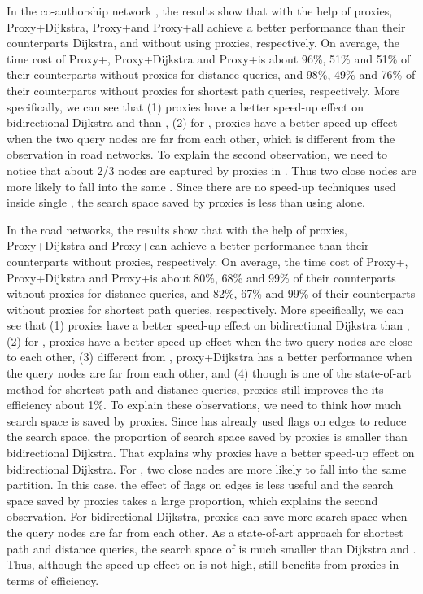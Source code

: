 In the co-authorship network \dblpone, the results show that with the help of proxies, Proxy+Dijkstra, Proxy+\arcflag and Proxy+\tnr all achieve a better performance than their counterparts Dijkstra, \arcflag and \tnr without using proxies, respectively. On average, the time cost of Proxy+\arcflag, Proxy+Dijkstra and Proxy+\tnr is about 96\%, 51\% and 51\% of their counterparts without proxies for distance queries, and 98\%, 49\% and 76\% of their counterparts without proxies for shortest path queries, respectively. More specifically, we can see that (1) proxies have a better speed-up effect on bidirectional Dijkstra and \tnr than \arcflag, (2) for \arcflag, proxies have a better speed-up effect when the two query nodes are far from each other, which is different from the observation in road networks. To explain the second observation, we need to notice that about 2/3 nodes are captured by proxies in \dblpone. Thus two close nodes are more likely to fall into the same \dras. Since there are no speed-up techniques used inside single \dras, the search space saved by proxies is less than using \arcflag alone.

In the road networks, the results show that with the help of proxies, Proxy+Dijkstra and Proxy+\arcflag can achieve a better performance than their counterparts without proxies, respectively. On average, the time cost of Proxy+\arcflag, Proxy+Dijkstra and Proxy+\ah is about 80\%, 68\% and 99\% of their counterparts without proxies for distance queries, and 82\%, 67\% and 99\% of their counterparts without proxies for shortest path queries, respectively. More specifically, we can see that (1) proxies have a better speed-up effect on bidirectional Dijkstra than \arcflag, (2) for \arcflag, proxies have a better speed-up effect when the two query nodes are close to each other, (3) different from \arcflag, proxy+Dijkstra has a better performance when the query nodes are far from each other, and (4) though \ah is one of the state-of-art method for shortest path and distance queries, proxies still improves the its efficiency about 1\%. To explain these observations, we need to think how much search space is saved by proxies. Since \arcflag has already used flags on edges to reduce the search space, the proportion of search space saved by proxies is smaller than bidirectional Dijkstra. That explains why proxies have a better speed-up effect on bidirectional Dijkstra. For \arcflag, two close nodes are more likely to fall into the same partition. In this case, the effect of flags on edges is less useful and the search space saved by proxies takes a large proportion, which explains the second observation. For bidirectional Dijkstra, proxies can save more search space when the query nodes are far from each other. As a state-of-art approach for shortest path and distance queries, the search space of \ah is much smaller than Dijkstra and \arcflag. Thus, although the speed-up effect on \ah is not high, \ah still benefits from proxies in terms of efficiency.

